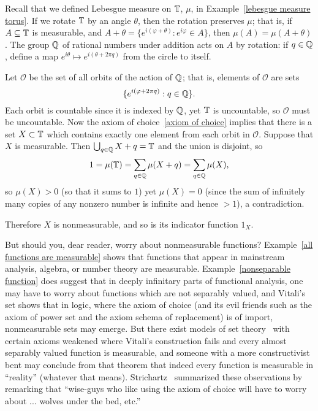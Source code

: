 \begin{example}
\label{Vitali set}
Recall that we defined Lebesgue measure on $\mathbb{T}$, $\mu$, in Example~\ref{lebesgue measure torus}.
If we rotate $\mathbb{T}$ by an angle $\theta$, then the rotation preserves $\mu$; that is, if $A \subseteq \mathbb{T}$ is measurable, and $A + \theta = \{e^{i(\varphi+\theta)}: e^{i\varphi} \in A\}$, then $\mu(A) = \mu(A + \theta)$.
The group $\mathbb{Q}$ of rational numbers under addition acts on $A$ by rotation: if $q \in \mathbb{Q}$, define a map $e^{i\theta} \mapsto e^{i(\theta + 2\pi q)}$ from the circle to itself.

Let $\mathcal O$ be the set of all orbits of the action of $\mathbb{Q}$; that is, elements of $\mathcal O$ are sets
\[\{e^{i(\varphi+2\pi q)}: q \in \mathbb{Q}\}.\]
Each orbit is countable since it is indexed by $\mathbb{Q}$, yet $\mathbb{T}$ is uncountable, so $\mathcal O$ must be uncountable.
Now the axiom of choice~\ref{axiom of choice} implies that there is a set $X \subset \mathbb{T}$ which contains exactly one element from each orbit in $\mathcal O$.
Suppose that $X$ is measurable. Then $\bigcup_{q \in \mathbb{Q}} X + q = \mathbb{T}$ and the union is disjoint, so
\[1 = \mu(\mathbb{T}) = \sum_{q \in \mathbb{Q}} \mu(X +  q) = \sum_{q \in \mathbb{Q}} \mu(X),\]
so $\mu(X) > 0$ (so that it sums to $1$) yet $\mu(X) = 0$ (since the sum of infinitely many copies of any nonzero number is infinite and hence $> 1$), a contradiction.

Therefore $X$ is nonmeasurable, and so is its indicator function $1_X$.
\end{example}

\begin{subsec}
But should you, dear reader, worry about nonmeasurable functions?
Example~\ref{all functions are measurable} shows that functions that appear in mainstream analysis, algebra, or number theory are measurable.
Example~\ref{nonseparable function} does suggest that in deeply infinitary parts of functional analysis, one may have to worry about functions which are not separably valued, and Vitali's set shows that in logic, where the axiom of choice (and its evil friends such as the axiom of power set and the axiom schema of replacement) is of import, nonmeasurable sets may emerge.
But there exist models of set theory~\cite{Solovay1970} with certain axioms weakened where Vitali's construction fails and every almost separably valued function is measurable, and someone with a more constructivist bent may conclude from that theorem that indeed every function is measurable in ``reality'' (whatever that means).
Strichartz~\cite[Chapter 1]{strichartz2003guide} summarized these observations by remarking that ``wise-guys who like using the axiom of choice will have to worry about ... wolves under the bed, etc.''
\end{subsec}


